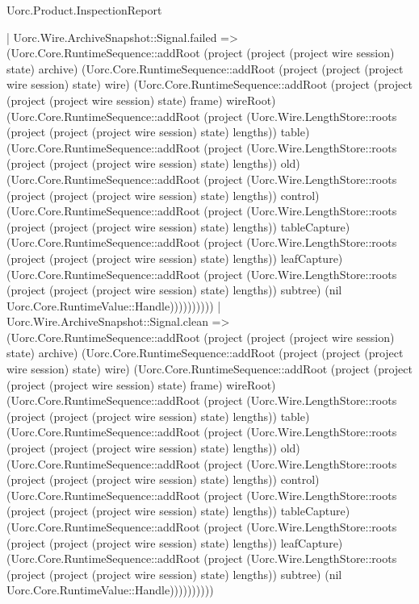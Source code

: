 \begin{lexlean}{Uorc.Product.InspectionReport}
\begin{semanticmodule}
{    | Uorc.Wire.ArchiveSnapshot::Signal.failed => (Uorc.Core.RuntimeSequence::addRoot (project (project (project wire session) state) archive) (Uorc.Core.RuntimeSequence::addRoot (project (project (project wire session) state) wire) (Uorc.Core.RuntimeSequence::addRoot (project (project (project (project wire session) state) frame) wireRoot) (Uorc.Core.RuntimeSequence::addRoot (project (Uorc.Wire.LengthStore::roots (project (project (project wire session) state) lengths)) table) (Uorc.Core.RuntimeSequence::addRoot (project (Uorc.Wire.LengthStore::roots (project (project (project wire session) state) lengths)) old) (Uorc.Core.RuntimeSequence::addRoot (project (Uorc.Wire.LengthStore::roots (project (project (project wire session) state) lengths)) control) (Uorc.Core.RuntimeSequence::addRoot (project (Uorc.Wire.LengthStore::roots (project (project (project wire session) state) lengths)) tableCapture) (Uorc.Core.RuntimeSequence::addRoot (project (Uorc.Wire.LengthStore::roots (project (project (project wire session) state) lengths)) leafCapture) (Uorc.Core.RuntimeSequence::addRoot (project (Uorc.Wire.LengthStore::roots (project (project (project wire session) state) lengths)) subtree) (nil Uorc.Core.RuntimeValue::Handle))))))))))
    | Uorc.Wire.ArchiveSnapshot::Signal.clean => (Uorc.Core.RuntimeSequence::addRoot (project (project (project wire session) state) archive) (Uorc.Core.RuntimeSequence::addRoot (project (project (project wire session) state) wire) (Uorc.Core.RuntimeSequence::addRoot (project (project (project (project wire session) state) frame) wireRoot) (Uorc.Core.RuntimeSequence::addRoot (project (Uorc.Wire.LengthStore::roots (project (project (project wire session) state) lengths)) table) (Uorc.Core.RuntimeSequence::addRoot (project (Uorc.Wire.LengthStore::roots (project (project (project wire session) state) lengths)) old) (Uorc.Core.RuntimeSequence::addRoot (project (Uorc.Wire.LengthStore::roots (project (project (project wire session) state) lengths)) control) (Uorc.Core.RuntimeSequence::addRoot (project (Uorc.Wire.LengthStore::roots (project (project (project wire session) state) lengths)) tableCapture) (Uorc.Core.RuntimeSequence::addRoot (project (Uorc.Wire.LengthStore::roots (project (project (project wire session) state) lengths)) leafCapture) (Uorc.Core.RuntimeSequence::addRoot (project (Uorc.Wire.LengthStore::roots (project (project (project wire session) state) lengths)) subtree) (nil Uorc.Core.RuntimeValue::Handle))))))))))
}
\end{semanticmodule}
\end{lexlean}
